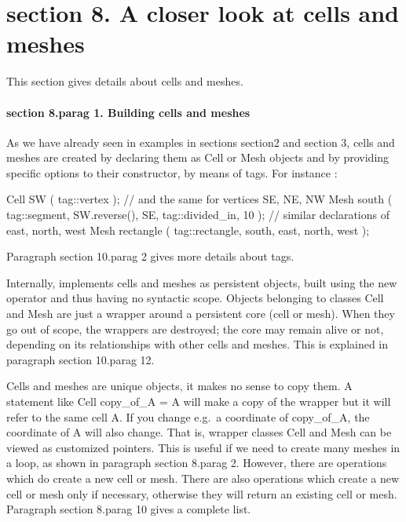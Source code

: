 \section{\numb section 8. A closer look at cells and meshes}

This section gives details about cells and meshes.


\paragraph{\numb section 8.\numb parag 1. Building cells and meshes}

As we have already seen in examples in sections \numb section2 and \numb section 3,
cells and meshes are created by declaring them as {\codett Cell} or {\codett Mesh} objects
and by providing specific options to their constructor, by means of {\codett tag}s.
For instance :

\verbatim
   Cell SW ( tag::vertex ); // and the same for vertices SE, NE, NW
   Mesh south ( tag::segment, SW.reverse(), SE, tag::divided_in, 10 );
   // similar declarations of east, north, west
   Mesh rectangle ( tag::rectangle, south, east, north, west );
\endverbatim

Paragraph \numb section 10.\numb parag 2 gives more details about {\codett tag}s.

Internally, {\maniFEM} implements cells and meshes as persistent objects, built
using the {\codett new} operator and thus having no syntactic scope.
Objects belonging to classes {\codett Cell} and {\codett Mesh} are just a wrapper
around a persistent core (cell or mesh).
When they go out of scope, the wrappers are destroyed; the core may remain alive or not,
depending on its relationships with other cells and meshes.
This is explained in paragraph \numb section 10.\numb parag 12.

Cells and meshes are unique objects, it makes no sense to copy them.
A statement like {\codett Cell copy\_of\_A = A} will make a copy of the wrapper
but it will refer to the same cell {\codett A}.
If you change e.g.\ a coordinate of {\codett copy\_of\_A}, the coordinate of {\codett A}
will also change.
That is, wrapper classes {\codett Cell} and {\codett Mesh} can be viewed as
customized pointers.
This is useful if we need to create many meshes in a loop, as shown in paragraph
\numb section 8.\numb parag 2.
However, there are operations which do create a new cell or mesh.
There are also operations which create a new cell or mesh only if necessary,
otherwise they will return an existing cell or mesh.
Paragraph \numb section 8.\numb parag 10 gives a complete list.

